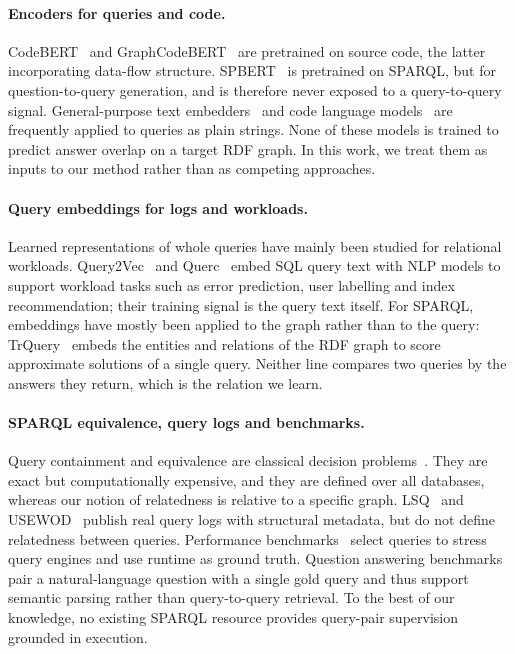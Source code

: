 \documentclass[runningheads]{llncs}
\begin{document}
\paragraph{Encoders for queries and code.}
CodeBERT~\cite{feng2020codebert} and
GraphCodeBERT~\cite{guo2021graphcodebert} are pretrained on source code, the
latter incorporating data-flow structure. SPBERT~\cite{tran2021spbert} is
pretrained on SPARQL, but for question-to-query generation, and is therefore
never exposed to a query-to-query signal. General-purpose text
embedders~\cite{song2020mpnet,wang2022e5,xiao2024bge,li2023gte,zhang2025qwen3emb}
and code language models~\cite{hui2024qwen25coder} are frequently applied to
queries as plain strings. None of these models is trained to predict answer
overlap on a target RDF graph. In this work, we treat them as inputs to our
method rather than as competing approaches.

\paragraph{Query embeddings for logs and workloads.}
Learned representations of whole queries have mainly been studied for
relational workloads. Query2Vec~\cite{jain2018query2vec} and
Querc~\cite{jain2019querc} embed SQL query text with NLP models to support
workload tasks such as error prediction, user labelling and index
recommendation; their training signal is the query text itself. For SPARQL,
embeddings have mostly been applied to the graph rather than to the query:
TrQuery~\cite{zhang2018trquery} embeds the entities and relations of the RDF
graph to score approximate solutions of a single query. Neither line compares
two queries by the answers they return, which is the relation we learn.

\paragraph{SPARQL equivalence, query logs and benchmarks.}
Query containment and equivalence are classical decision
problems~\cite{chandra1977,pichler2014containment}. They are exact but
computationally expensive, and they are defined over all databases, whereas
our notion of relatedness is relative to a specific graph.
LSQ~\cite{saleem2015lsq} and USEWOD~\cite{luczak2014usewod} publish real
query logs with structural metadata, but do not define relatedness between
queries. Performance
benchmarks~\cite{morsey2011dbpsb,saleem2015feasible,angles2022wdbench} select
queries to stress query engines and use runtime as ground truth. Question
answering
benchmarks~\cite{dubey2019lcquad,usbeck2017qald7,kosten2023spider4sparql}
pair a natural-language question with a single gold query and thus support
semantic parsing rather than query-to-query retrieval. To the best of our
knowledge, no existing SPARQL resource provides query-pair supervision
grounded in execution.
\end{document}
